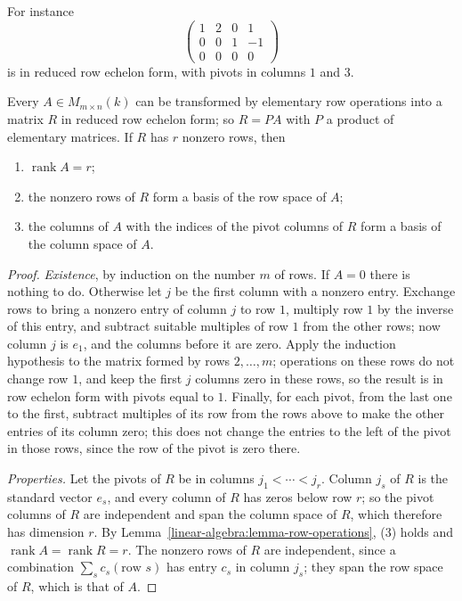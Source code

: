 For instance
\[
\begin{pmatrix}1 & 2 & 0 & 1\\ 0 & 0 & 1 & -1\\ 0 & 0 & 0 & 0\end{pmatrix}
\]
is in reduced row echelon form, with pivots in columns $1$ and $3$.

\begin{theorem}\label{linear-algebra:theorem-gaussian-elimination}
Every $A \in M_{m \times n}(k)$ can be transformed by elementary row operations into a matrix $R$ in reduced row echelon form; so $R = PA$ with $P$ a product of elementary matrices. If $R$ has $r$
nonzero rows, then
\begin{enumerate}
\item $\operatorname{rank}A = r$;
\item the nonzero rows of $R$ form a basis of the row space of $A$;
\item the columns of $A$ with the indices of the pivot columns of $R$ form a basis of the column space of $A$.
\end{enumerate}
\end{theorem}

\begin{proof}
\emph{Existence}, by induction on the number $m$ of rows. If $A = 0$ there is nothing to do. Otherwise let $j$ be the first column with a nonzero entry. Exchange rows to bring a nonzero entry of
column $j$ to row $1$, multiply row $1$ by the inverse of this entry, and subtract suitable multiples of row $1$ from the other rows; now column $j$ is $e_1$, and the columns before it are zero. Apply
the induction hypothesis to the matrix formed by rows $2, \ldots, m$; operations on these rows do not change row $1$, and keep the first $j$ columns zero in these rows, so the result is in row echelon
form with pivots equal to $1$. Finally, for each pivot, from the last one to the first, subtract multiples of its row from the rows above to make the other entries of its column zero; this does not
change the entries to the left of the pivot in those rows, since the row of the pivot is zero there.

\emph{Properties.} Let the pivots of $R$ be in columns $j_1 < \cdots < j_r$. Column $j_s$ of $R$ is the standard vector $e_s$, and every column of $R$ has zeros below row $r$; so the pivot columns of $R$
are independent and span the column space of $R$, which therefore has dimension $r$. By Lemma~\ref{linear-algebra:lemma-row-operations}, (3) holds and $\operatorname{rank}A = \operatorname{rank}R = r$. The
nonzero rows of $R$ are independent, since a combination $\sum_sc_s(\text{row }s)$ has entry $c_s$ in column $j_s$; they span the row space of $R$, which is that of $A$.
\end{proof}

